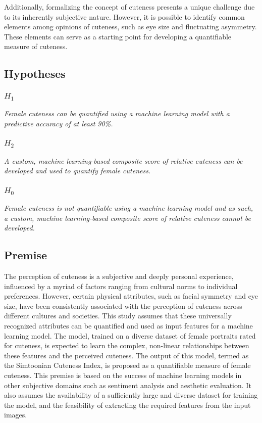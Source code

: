 \documentclass{article}
\begin{document}
Additionally, formalizing the concept of cuteness presents a unique challenge due to its inherently subjective nature. However, it is possible to identify common elements among opinions of cuteness, such as eye size and fluctuating asymmetry. These elements can serve as a starting point for developing a quantifiable measure of cuteness.

\subsection{Hypotheses}
\subsubsection{$H_1$}
\textit{Female cuteness can be quantified using a machine learning model with a predictive accuracy of at least 90\%.}

\subsubsection{$H_2$}
\textit{A custom, machine learning-based composite score of relative cuteness can be developed and used to quantify female cuteness.}

\subsubsection{$H_0$}
\textit{Female cuteness is not quantifiable using a machine learning model and as such, a custom, machine learning-based composite score of relative cuteness cannot be developed.}

\subsection{Premise}
The perception of cuteness is a subjective and deeply personal experience, influenced by a myriad of factors ranging from cultural norms to individual preferences. However, certain physical attributes, such as facial symmetry and eye size, have been consistently associated with the perception of cuteness across different cultures and societies. This study assumes that these universally recognized attributes can be quantified and used as input features for a machine learning model. The model, trained on a diverse dataset of female portraits rated for cuteness, is expected to learn the complex, non-linear relationships between these features and the perceived cuteness. The output of this model, termed as the Simtoonian Cuteness Index, is proposed as a quantifiable measure of female cuteness. This premise is based on the success of machine learning models in other subjective domains such as sentiment analysis and aesthetic evaluation. It also assumes the availability of a sufficiently large and diverse dataset for training the model, and the feasibility of extracting the required features from the input images.
\end{document}
